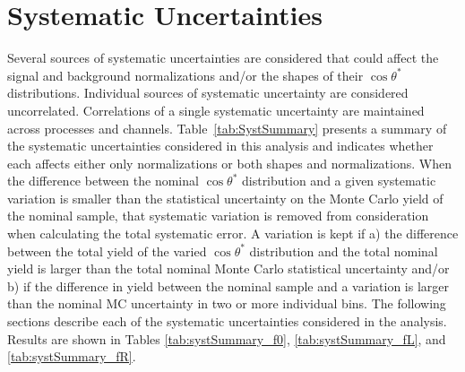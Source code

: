 \section{Systematic Uncertainties}
\label{sec:systematics}
Several sources of systematic uncertainties are considered that could affect the signal and background normalizations and/or the shapes of their $\cos\theta^*$ distributions. Individual sources of systematic uncertainty are considered uncorrelated. Correlations of a single systematic uncertainty are maintained across processes and channels. Table~\ref{tab:SystSummary} presents a summary of the systematic uncertainties considered in this analysis and indicates whether each affects either only normalizations or both shapes and normalizations.
When the difference between the nominal $\cos\theta^*$ distribution and a given systematic variation is smaller than the statistical uncertainty on the Monte Carlo yield of the nominal sample, that systematic variation is removed from consideration when calculating the total systematic error. A variation is kept if a) the difference between the total yield of the varied $\cos\theta^*$ distribution and the total nominal yield is larger than the total nominal Monte Carlo statistical uncertainty and/or b) if the difference in yield between the nominal sample and a variation is larger than the nominal MC uncertainty in two or more individual bins. %
The following sections describe each of the systematic uncertainties considered in the
analysis. Results are shown in Tables \ref{tab:systSummary_f0}, \ref{tab:systSummary_fL}, and \ref{tab:systSummary_fR}.

